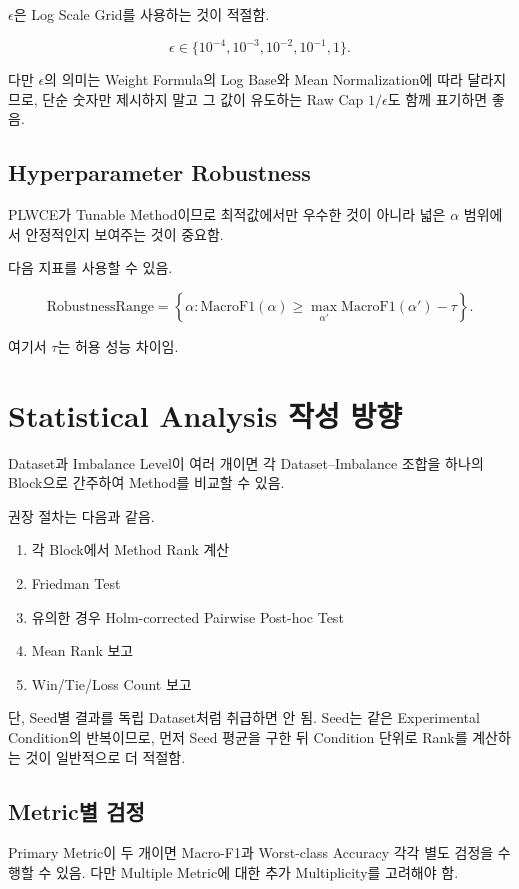 \documentclass[11pt,a4paper]{article}
\begin{document}
\(\epsilon\)은 Log Scale Grid를 사용하는 것이 적절함.

\[
\epsilon\in\{10^{-4},10^{-3},10^{-2},10^{-1},1\}.
\]

다만 \(\epsilon\)의 의미는 Weight Formula의 Log Base와 Mean Normalization에 따라 달라지므로, 단순 숫자만 제시하지 말고 그 값이 유도하는 Raw Cap \(1/\epsilon\)도 함께 표기하면 좋음.

\subsection{Hyperparameter Robustness}

PLWCE가 Tunable Method이므로 최적값에서만 우수한 것이 아니라 넓은 \(\alpha\) 범위에서 안정적인지 보여주는 것이 중요함.

다음 지표를 사용할 수 있음.

\[
\mathrm{RobustnessRange}
=
\left\{
\alpha:
\mathrm{MacroF1}(\alpha)
\geq
\max_{\alpha'}\mathrm{MacroF1}(\alpha')-\tau
\right\}.
\]

여기서 \(\tau\)는 허용 성능 차이임.

\section{Statistical Analysis 작성 방향}

Dataset과 Imbalance Level이 여러 개이면 각 Dataset--Imbalance 조합을 하나의 Block으로 간주하여 Method를 비교할 수 있음.

권장 절차는 다음과 같음.

\begin{enumerate}
\item 각 Block에서 Method Rank 계산
\item Friedman Test
\item 유의한 경우 Holm-corrected Pairwise Post-hoc Test
\item Mean Rank 보고
\item Win/Tie/Loss Count 보고
\end{enumerate}

단, Seed별 결과를 독립 Dataset처럼 취급하면 안 됨. Seed는 같은 Experimental Condition의 반복이므로, 먼저 Seed 평균을 구한 뒤 Condition 단위로 Rank를 계산하는 것이 일반적으로 더 적절함.

\subsection{Metric별 검정}

Primary Metric이 두 개이면 Macro-F1과 Worst-class Accuracy 각각 별도 검정을 수행할 수 있음. 다만 Multiple Metric에 대한 추가 Multiplicity를 고려해야 함.
\end{document}
